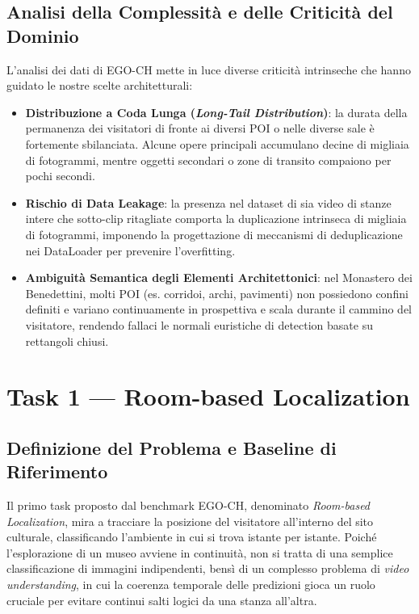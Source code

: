 \documentclass[a4paper,12pt]{report}
\begin{document}
\section{Analisi della Complessità e delle Criticità del Dominio}

L'analisi dei dati di EGO-CH mette in luce diverse criticità intrinseche che hanno guidato le nostre scelte architetturali:

\begin{itemize}
    \item \textbf{Distribuzione a Coda Lunga (\emph{Long-Tail Distribution})}: la durata della permanenza dei visitatori di fronte ai diversi POI o nelle diverse sale è fortemente sbilanciata. Alcune opere principali accumulano decine di migliaia di fotogrammi, mentre oggetti secondari o zone di transito compaiono per pochi secondi.
    \item \textbf{Rischio di Data Leakage}: la presenza nel dataset di sia video di stanze intere che sotto-clip ritagliate comporta la duplicazione intrinseca di migliaia di fotogrammi, imponendo la progettazione di meccanismi di deduplicazione nei DataLoader per prevenire l'overfitting.
    \item \textbf{Ambiguità Semantica degli Elementi Architettonici}: nel Monastero dei Benedettini, molti POI (es. corridoi, archi, pavimenti) non possiedono confini definiti e variano continuamente in prospettiva e scala durante il cammino del visitatore, rendendo fallaci le normali euristiche di detection basate su rettangoli chiusi.
\end{itemize}

\chapter{Task 1 --- Room-based Localization}

\section{Definizione del Problema e Baseline di Riferimento}
Il primo task proposto dal benchmark EGO-CH, denominato \emph{Room-based Localization}, mira a tracciare la posizione del visitatore all'interno del sito culturale, classificando l'ambiente in cui si trova istante per istante. Poiché l'esplorazione di un museo avviene in continuità, non si tratta di una semplice classificazione di immagini indipendenti, bensì di un complesso problema di \emph{video understanding}, in cui la coerenza temporale delle predizioni gioca un ruolo cruciale per evitare continui salti logici da una stanza all'altra.
\end{document}
